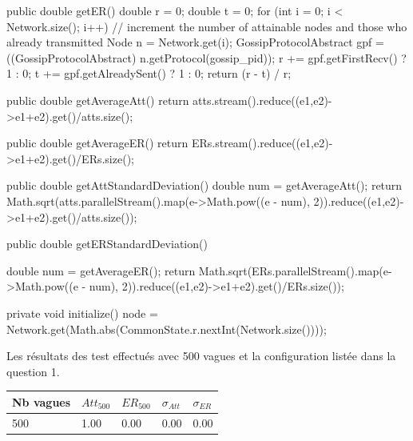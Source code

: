 \documentclass[10pt]{report}
\begin{document}
\begin{boxedlisting}
{	public double getER() {
		double r = 0;
		double t = 0;
		for (int i = 0; i < Network.size(); i++) { // increment the number of attainable nodes and those who already transmitted
			Node n = Network.get(i);
			GossipProtocolAbstract gpf = ((GossipProtocolAbstract) n.getProtocol(gossip_pid));
			r += gpf.getFirstRecv() ? 1 : 0;
			t += gpf.getAlreadySent() ? 1 : 0;
		}
		return (r - t) / r;
	}

	public double getAverageAtt() {
		return atts.stream().reduce((e1,e2)->e1+e2).get()/atts.size();
	}

	public double getAverageER() {
		return ERs.stream().reduce((e1,e2)->e1+e2).get()/ERs.size();
	}

	public double getAttStandardDeviation() {
		double num = getAverageAtt();
		return Math.sqrt(atts.parallelStream().map(e->Math.pow((e - num), 2)).reduce((e1,e2)->e1+e2).get()/atts.size());
	}

	public double getERStandardDeviation() {
		double num = getAverageER();
		return Math.sqrt(ERs.parallelStream().map(e->Math.pow((e - num), 2)).reduce((e1,e2)->e1+e2).get()/ERs.size());
		
	}

	private void initialize() {
		node = Network.get(Math.abs(CommonState.r.nextInt(Network.size())));
	}
}

\end{boxedlisting}

Les résultats des test effectués avec 500 vagues et la configuration listée dans la question 1.\\

\begin{center}
\begin{tabular}{|l|l|l|l|l|}\hline
	Nb vagues & $Att_{500}$ & $ER_{500}$ & $\sigma_{Att}$ & $\sigma_{ER}$\\ \hline
	500 & 1.00 & 0.00 & 0.00 & 0.00 \\ \hline 
\end{tabular}
\end{center}
\end{document}
